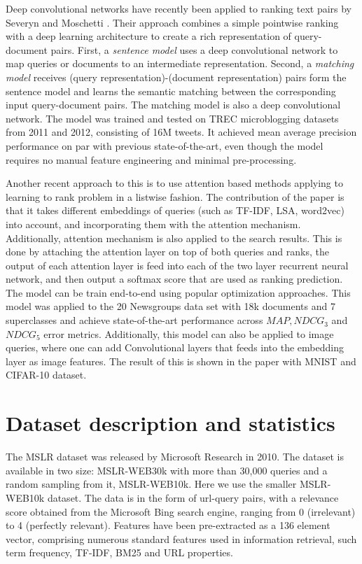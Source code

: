 \documentclass[english]{article}
\theoremstyle{definition}
\begin{document}
\begin{multicols}{2}
Deep convolutional networks have recently been applied to ranking text pairs by Severyn and Moschetti \cite{severyn2015learning}.  Their approach combines a simple pointwise ranking with a deep learning architecture to create a rich representation of query-document pairs.  First, a \textit{sentence model} uses a deep convolutional network to map queries or documents to an intermediate representation.  Second, a \textit{matching model} receives (query representation)-(document representation) pairs form the sentence model and learns the semantic matching between the corresponding input query-document pairs.  The matching model is also a  deep convolutional network.  The model was trained and tested on TREC microblogging datasets from 2011 and 2012, consisting of 16M tweets.  It achieved mean average precision performance on par with previous state-of-the-art, even though the model requires no manual feature engineering and minimal pre-processing.

Another recent approach to this is to use attention based methods applying to  learning to rank problem \cite{wang2017attention} in a listwise fashion. The contribution of the paper is that it takes different embeddings of queries (such as TF-IDF, LSA, word2vec) into account, and incorporating them with the attention mechanism. Additionally, attention mechanism is also applied to the search results. This is done by attaching the attention layer on top of both queries and ranks, the output of each attention layer is feed into each of the two layer recurrent neural network, and then output a softmax score that are used as ranking prediction. The model can be train end-to-end using popular optimization approaches. This model was applied to the 20 Newsgroups data set with 18k documents and 7 superclasses and achieve state-of-the-art performance across $MAP, NDCG_3$ and $NDCG_5$ error metrics. Additionally, this model can also be applied to image queries, where one can add Convolutional layers that feeds  into the embedding layer as image features. The result of this is shown in the paper with MNIST and CIFAR-10 dataset.

\section{Dataset description and statistics}

The MSLR dataset \cite{DBLP:journals/corr/QinL13} was released by Microsoft Research in 2010.  The dataset is available in two size: MSLR-WEB30k with more than 30,000 queries and a random sampling from it, MSLR-WEB10k.  Here we use the smaller MSLR-WEB10k dataset.  The data is in the form of url-query pairs, with a relevance score obtained from the Microsoft Bing search engine, ranging from 0 (irrelevant) to 4 (perfectly relevant).  Features have been pre-extracted as a 136 element vector, comprising numerous standard features used in information retrieval, such term frequency, TF-IDF, BM25 and URL properties.


\end{multicols}
\end{document}
